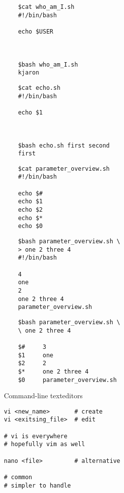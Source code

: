 \documentclass[xcolor=dvipsnames]{beamer}
\begin{document}
\begin{frame}[fragile]
\LARGE
\begin{verbatim}
	$cat who_am_I.sh
	#!/bin/bash

	echo $USER



	$bash who_am_I.sh
	kjaron
\end{verbatim}
\end{frame}

\begin{frame}[fragile]
\LARGE
\begin{verbatim}
	$cat echo.sh
	#!/bin/bash

	echo $1



	$bash echo.sh first second
	first
\end{verbatim}
\end{frame}

\begin{frame}[fragile]
\LARGE
\begin{verbatim}
	$cat parameter_overview.sh
	#!/bin/bash

	echo $#
	echo $1
	echo $2
	echo $*
	echo $0
\end{verbatim}
\end{frame}

\begin{frame}[fragile]
\LARGE
\begin{verbatim}
	$bash parameter_overview.sh \
	> one 2 three 4
	#!/bin/bash

	4
	one
	2
	one 2 three 4
	parameter_overview.sh
\end{verbatim}
\end{frame}

\begin{frame}[fragile]
\LARGE
\begin{verbatim}
	$bash parameter_overview.sh \
	\ one 2 three 4

	$#     3
	$1     one
	$2     2
	$*     one 2 three 4
	$0     parameter_overview.sh
\end{verbatim}
\end{frame}

\begin{frame}[fragile]
	\begin{center}
		\Huge
		Command-line texteditors
	\end{center}
	\Large
\begin{verbatim}
vi <new_name>       # create
vi <exitsing_file>  # edit

# vi is everywhere
# hopefully vim as well

nano <file>         # alternative

# common
# simpler to handle
\end{verbatim}
\end{frame}
\end{document}
